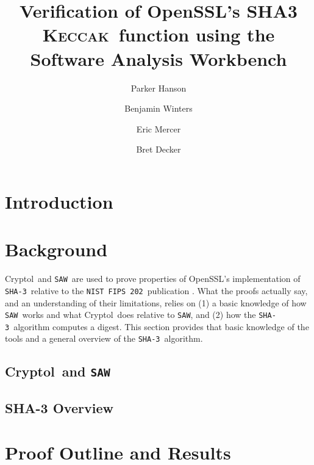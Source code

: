 \documentclass[runningheads]{llncs}
\newcommand{\keccak}{\textsc{Keccak}}
\newcommand{\shaThree}{\texttt{SHA-3}}
\newcommand{\nist}{\texttt{NIST}}
\newcommand{\fips}{\texttt{FIPS 202}}
\newcommand{\saw}{\texttt{SAW}}
\newcommand{\cryptol}{Cryptol}
\newcommand{\openssl}{OpenSSL}
\begin{document}
%
\title{Verification of OpenSSL's SHA3 \keccak\ function using the Software Analysis Workbench}
%
%
\author{
  Parker Hanson \and
  Benjamin Winters \and
  Eric Mercer \and
  Bret Decker
}
%
%
%
\maketitle              %
%
\begin{abstract}

\end{abstract}

\section{Introduction}\label{sec:introduction}


\section{Background}\label{sec:background}
\cryptol\ and \saw\ are used to prove properties of \openssl's implementation of \shaThree\ relative to the \nist\ \fips\ publication \cite{fips202}. 
What the proofs actually say, and an understanding of their limitations, relies on (1) a basic knowledge of how \saw\ works and what \cryptol\ does relative to \saw, and (2) how the \shaThree\ algorithm computes a digest.
This section provides that basic knowledge of the tools and a general overview of the \shaThree\ algorithm.

\subsection{\cryptol\ and \saw}\label{subsec:saw}

\subsection{SHA-3 Overview}\label{subsec:sha3}



\section{Proof Outline and Results}\label{sec:proof}

\end{document}
